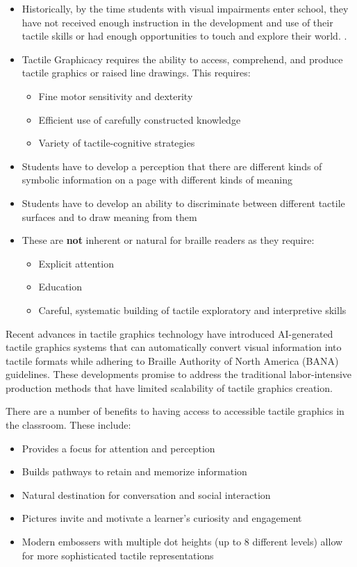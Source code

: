 \begin{itemize}
 \item Historically, by the time students with visual impairments enter school, they have not received enough instruction in the development and use of their tactile skills or had enough opportunities to touch and explore their world. \cite{TactileSkillsDevelopment}.
 \item Tactile Graphicacy requires the ability to access, comprehend, and produce tactile graphics or raised line drawings. This requires:
   \begin{itemize}
     \item Fine motor sensitivity and dexterity
     \item Efficient use of carefully constructed knowledge
     \item Variety of tactile-cognitive strategies
   \end{itemize}
 \item Students have to develop a perception that there are different kinds of symbolic information on a page with different kinds of meaning
 \item Students have to develop an ability to discriminate between different tactile surfaces and to draw meaning from them
 \item These are \textbf{not} inherent or natural for braille readers as they require:
   \begin{itemize}
     \item Explicit attention
     \item Education
     \item Careful, systematic building of tactile exploratory and interpretive skills
   \end{itemize}
\end{itemize}


Recent advances in tactile graphics technology have introduced AI-generated tactile graphics systems that can automatically convert visual information into tactile formats while adhering to Braille Authority of North America (BANA) guidelines. These developments promise to address the traditional labor-intensive production methods that have limited scalability of tactile graphics creation.

There are a number of benefits to having access to accessible tactile graphics in the classroom. These include:

\begin{itemize}
 \item Provides a focus for attention and perception
 \item Builds pathways to retain and memorize information
 \item Natural destination for conversation and social interaction
 \item Pictures invite and motivate a learner's curiosity and engagement
 \item Modern embossers with multiple dot heights (up to 8 different levels) allow for more sophisticated tactile representations
\end{itemize}

